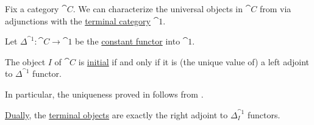 \begin{proposition}\label{thm:universal_objects_as_adjunctions}
  Fix a category \( \cat{C} \). We can characterize the universal objects in \( \cat{C} \) from  via adjunctions with the \hyperref[def:universal_categories]{terminal category} \( \cat{1} \).

  Let \( \Delta^{\cat{1}}: \cat{C} \to \cat{1} \) be the \hyperref[def:diagonal_functor]{constant functor} into \( \cat{1} \).

  \begin{thmenum}
     The object \( I \) of \( \cat{C} \) is \hyperref[def:universal_objects]{initial} if and only if it is (the unique value of) a left adjoint to \( \Delta^{\cat{1}} \) functor.

    In particular, the uniqueness proved in  follows from .

     \hyperref[thm:categorical_principle_of_duality]{Dually}, the \hyperref[def:universal_objects]{terminal objects} are exactly the right adjoint to \( \Delta_I^{\cat{1}} \) functors.
  \end{thmenum}
\end{proposition}
